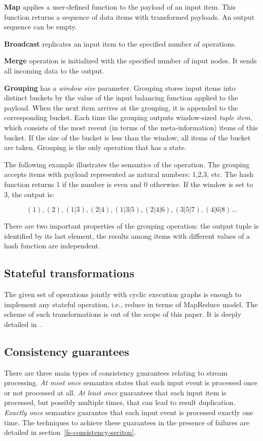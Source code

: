 {\bf Map} applies a user-defined function to the payload of an input item. This function returns a sequence of data items with transformed payloads. An output sequence can be empty.

{\bf Broadcast} replicates an input item to the specified number of operations.

{\bf Merge} operation is initialized with the specified number of input nodes. It sends all incoming data to the output.

{\bf Grouping} has a {\it window size} parameter. Grouping stores input items into distinct buckets by the value of the input balancing function applied to the payload. When the next item arrives at the grouping, it is appended to the corresponding bucket. Each time the grouping outputs window-sized {\it tuple item}, which consists of the most recent (in terms of the meta-information) items of this bucket. If the size of the bucket is less than the window, all items of the bucket are taken. Grouping is the only operation that has a state.

The following example illustrates the semantics of the operation. The grouping accepts items with payload represented as natural numbers: 1,2,3, etc. The hash function returns 1 if the number is even and 0 otherwise. If the window is set to 3, the output is:

\[(1), (2), (1|3), (2|4), (1|3|5), (2|4|6), (3|5|7), (4|6|8)...\]

There are two important properties of the grouping operation: the output tuple is identified by its last element, the results among items with different values of a hash function are independent.

\subsection{Stateful transformations}
The given set of operations jointly with cyclic execution graphs is enough to implement any stateful operation, i.e., reduce in terms of MapReduce model. The scheme of such transformations is out of the scope of this paper. It is deeply detailed in~\cite{we2018seim}.

\subsection{Consistency guarantees}
There are three main types of consistency guarantees relating to stream processing. {\it At most once} semantics states that each input event is processed once or not processed at all. {\it At least once} guarantees that each input item is processed, but possibly multiple times, that can lead to result duplication. {\it Exactly once} semantics guarantee that each input event is processed exactly one time. The techniques to achieve these guarantees in the presence of failures are detailed in section~\ref{fs-consistency-seciton}.


